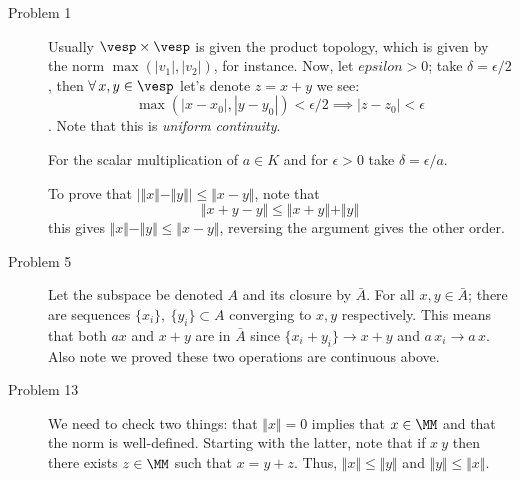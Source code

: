 \begin{description}
    \item[Problem 1] Usually $\vesp\times \vesp$ is given the product topology, which is given by the norm $\max(|v_1|,|v_2|)$, for instance. Now, let $epsilon>0$; take $\delta=\epsilon/2$, then $\forall \, x,y\in \vesp$ let's denote $z=x+y$ we see:
    $$    \max(|x-x_0|,|y-y_0|) < \epsilon/2 \implies |z-z_0|< \epsilon $$.
    Note that this is \emph{uniform continuity}.

    For the scalar multiplication of $a\in K$ and for $\epsilon>0$ take $\delta=\epsilon/a$.

    To prove that $|\Vert x \Vert - \Vert y \Vert | \leq \Vert x-y\Vert$, note that 
    $$\Vert x + y -y \Vert \leq \Vert x+ y\Vert + \Vert y \Vert$$
    this gives $\Vert x\Vert - \Vert y \Vert \leq \Vert x-y\Vert$, reversing the argument gives the other order.
\item[Problem 5] Let the subspace be denoted $A$ and its closure by $\bar A$. For all $x,y \in \bar A$; there are  sequences $\{x_i\},\ \{y_i\}\subset A$ converging to $x,y$ respectively. This means that both $ax$ and $x+y$ are in $ \bar A$ since $\{x_i+ y_i\}\to x+y$ and $a\, x_i \to a\, x$. Also note we proved these two operations are continuous above.
    \item[Problem 13] We  need to check two things: that $\Vert x\Vert=0$ implies that $x\in \MM$ and that the norm is well-defined. Starting with the latter, note that if $x~y$ then there exists $z\in \MM$ such that $x=y+z$. Thus, $\Vert x\Vert \leq \Vert y\Vert$ and $\Vert y\Vert \leq \Vert x\Vert$.
\end{description}
